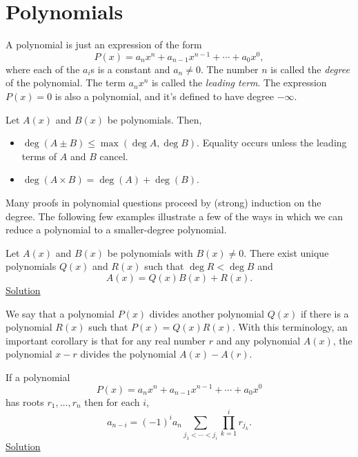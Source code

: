 \section{Polynomials}
A polynomial is just an expression of the form
\[P(x)=a_n x^n+a_{n-1}x^{n-1}+\cdots+a_0x^0,\] where each of the $a_i$s is a
constant and $a_n\ne 0$.
The number $n$ is called the \emph{degree} of the polynomial. The term $a_n x^n$
is called the \emph{leading term}. The expression
$P(x)=0$ is also a polynomial, and it's defined to have degree $-\infty$.

\begin{result}\label{r:n:a:polys:1}
  Let $A(x)$ and $B(x)$ be polynomials. Then,
  \begin{itemize}
    \item $\deg(A\pm B)\le\max(\deg A,\deg B)$. Equality occurs unless the
      leading terms of $A$ and $B$ cancel.
    \item $\deg(A\times B)=\deg(A)+\deg(B)$.
  \end{itemize}
\end{result}

Many proofs in polynomial questions proceed by (strong) induction on the degree. The
following few examples illustrate a few of the ways in which we can reduce a
polynomial to a smaller-degree polynomial.

\begin{result}\label{r:n:a:polys:2}
  Let $A(x)$ and $B(x)$ be polynomials with $B(x)\ne 0$. There exist unique
  polynomials $Q(x)$ and $R(x)$ such that $\deg R<\deg B$ and
  \[A(x)=Q(x)B(x)+R(x).\]
  \hyperlink{sr:n:a:polys:2}{Solution}
\end{result}
We say that a polynomial $P(x)$ divides another polynomial $Q(x)$ if there is a
polynomial $R(x)$ such that $P(x)=Q(x)R(x)$.
With this terminology, an important corollary is that for any real number $r$ and any polynomial
$A(x)$, the polynomial $x-r$ divides the polynomial $A(x)-A(r)$.
\begin{result}\label{r:n:a:polys:3}
  If a polynomial \[P(x)=a_n x^n+a_{n-1}x^{n-1}+\cdots+a_0x^0\] has roots
  $r_1,\ldots,r_n$ then for each $i$, \[a_{n-i}=(-1)^i a_n
  \sum_{j_1<\cdots<j_i} \prod_{k=1}^i r_{j_k}.\]
  \hyperlink{sr:n:a:polys:3}{Solution}
\end{result}
